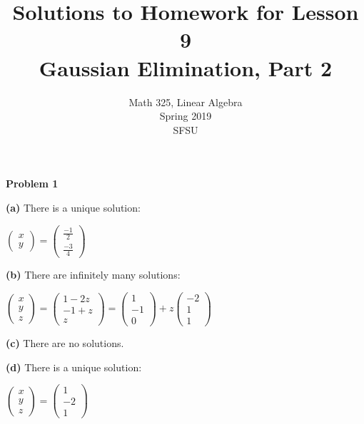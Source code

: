 \documentclass[oneside,12pt]{amsart}
\begin{document}
\title{Solutions to Homework for Lesson 9 \\ Gaussian Elimination, Part 2}
\author{Math 325, Linear Algebra \\ Spring 2019\\ SFSU }
\date{}

\maketitle


\textbf{Problem 1}

\bigskip


\textbf{(a)} There is a unique solution:

\bigskip

$
\begin{pmatrix}
x \\  y
\end{pmatrix}
=
\begin{pmatrix}
\frac{-1}{2} \\[6pt]
\frac{-3}{4}
\end{pmatrix}
$


\bigskip

\textbf{(b)} There are infinitely many solutions:

\bigskip

$
\begin{pmatrix}
x \\  y \\z
\end{pmatrix}
=
\begin{pmatrix}
1-2z \\
-1+z\\
z
\end{pmatrix}
=
\begin{pmatrix}
1\\
-1 \\
0
\end{pmatrix}
+
z
\begin{pmatrix}
-2 \\
1 \\
1
\end{pmatrix}
$

\bigskip

\textbf{(c)} There are no solutions.

\bigskip

\textbf{(d)} There is a unique solution:

\bigskip

$
\begin{pmatrix}
x \\  y \\ z
\end{pmatrix}
=
\begin{pmatrix}
1 \\
-2 \\
1
\end{pmatrix}
$
\end{document}

